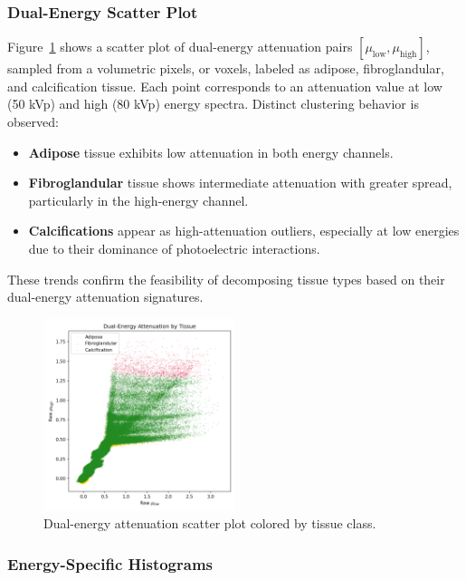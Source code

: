 \subsubsection{Dual-Energy Scatter Plot}

Figure~\ref{fig:scatter} shows a scatter plot of dual-energy attenuation pairs \([\mu_{\text{low}}, \mu_{\text{high}}]\),
sampled from a volumetric pixels, or voxels, labeled as adipose, fibroglandular, and calcification tissue. Each point corresponds to an
attenuation value at low (50 kVp) and high (80 kVp) energy spectra. Distinct clustering behavior is observed:

\begin{itemize}
    \item \textbf{Adipose} tissue exhibits low attenuation in both energy channels.
    \item \textbf{Fibroglandular} tissue shows intermediate attenuation with greater spread, particularly in the high-energy channel.
    \item \textbf{Calcifications} appear as high-attenuation outliers, especially at low energies due to their dominance of photoelectric interactions.
\end{itemize}

These trends confirm the feasibility of decomposing tissue types based on their dual-energy attenuation signatures.

\begin{figure}[h!]
    \centering
    \includegraphics[width=0.5\textwidth]{../fig/attenuation_scatter.png}
    \caption{Dual-energy attenuation scatter plot colored by tissue class.}
    \label{fig:scatter}
\end{figure}

\subsubsection{Energy-Specific Histograms}

